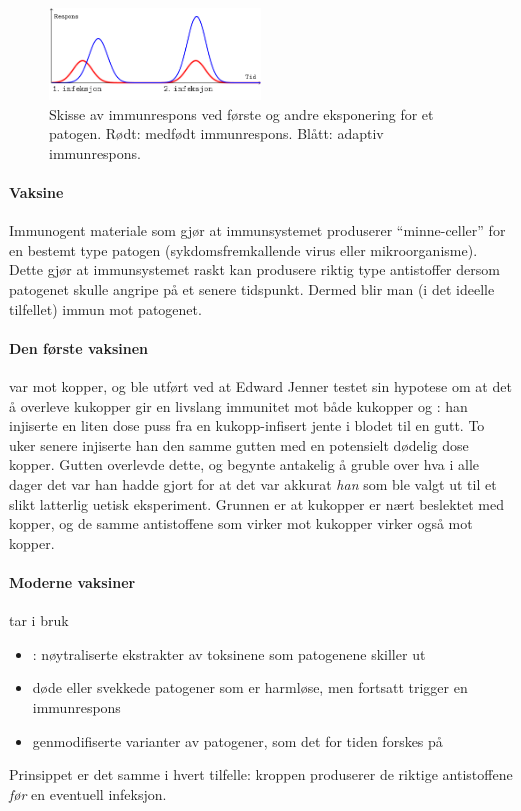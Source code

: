 \begin{figure}[H]
	\centering
	\includegraphics[width=0.50\textwidth]{immuneresponse.png}
	\caption{Skisse av immunrespons ved første og andre eksponering for et patogen. Rødt: medfødt immunrespons. Blått: adaptiv immunrespons.}
	\label{fig:immuneresponse}
\end{figure}


\paragraph{Vaksine} Immunogent materiale som gjør at immunsystemet produserer ``minne-celler'' for en bestemt type patogen (sykdomsfremkallende virus eller mikroorganisme). Dette gjør at immunsystemet raskt kan produsere riktig type antistoffer dersom patogenet skulle angripe på et senere tidspunkt. Dermed blir man (i det ideelle tilfellet) immun mot patogenet. 

\paragraph{Den første vaksinen} var mot kopper, og ble utført ved at Edward Jenner testet sin hypotese om at det å overleve kukopper gir en livslang immunitet mot både kukopper og : han injiserte en liten dose puss fra en kukopp-infisert jente i blodet til en gutt. To uker senere injiserte han den samme gutten med en potensielt dødelig dose kopper. Gutten overlevde dette, og begynte antakelig å gruble over hva i alle dager det var han hadde gjort for at det var akkurat \emph{han} som ble valgt ut til et slikt latterlig uetisk eksperiment. Grunnen er at kukopper er nært beslektet med kopper, og de samme antistoffene som virker mot kukopper virker også mot kopper.

\paragraph{Moderne vaksiner} tar i bruk
\begin{itemize}[nolistsep,noitemsep]
	\item {}: nøytraliserte ekstrakter av toksinene som patogenene skiller ut
	\item døde eller svekkede patogener som er harmløse, men fortsatt trigger en immunrespons
	\item genmodifiserte varianter av patogener, som det for tiden forskes på
\end{itemize}
Prinsippet er det samme i hvert tilfelle: kroppen produserer de riktige antistoffene \emph{før} en eventuell infeksjon.

